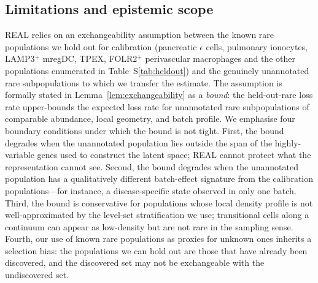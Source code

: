 
\subsection*{Limitations and epistemic scope}
REAL relies on an exchangeability assumption between the known rare populations we hold out for calibration (pancreatic $\epsilon$ cells, pulmonary ionocytes, LAMP3$^+$ mregDC, TPEX, FOLR2$^+$ perivascular macrophages and the other populations enumerated in Table~S\ref{tab:heldout}) and the genuinely unannotated rare subpopulations to which we transfer the estimate. The assumption is formally stated in Lemma~\ref{lem:exchangeability} as a \emph{bound}: the held-out-rare loss rate upper-bounds the expected loss rate for unannotated rare subpopulations of comparable abundance, local geometry, and batch profile. We emphasise four boundary conditions under which the bound is not tight. First, the bound degrades when the unannotated population lies outside the span of the highly-variable genes used to construct the latent space; REAL cannot protect what the representation cannot see. Second, the bound degrades when the unannotated population has a qualitatively different batch-effect signature from the calibration populations---for instance, a disease-specific state observed in only one batch. Third, the bound is conservative for populations whose local density profile is not well-approximated by the level-set stratification we use; transitional cells along a continuum can appear as low-density but are not rare in the sampling sense. Fourth, our use of known rare populations as proxies for unknown ones inherits a selection bias: the populations we can hold out are those that have already been discovered, and the discovered set may not be exchangeable with the undiscovered set.

